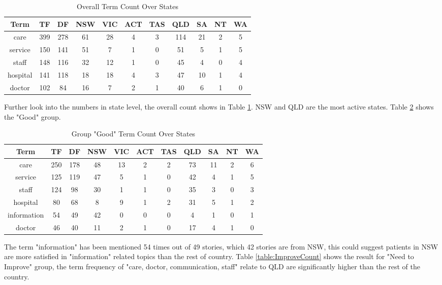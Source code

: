 \documentclass[11pt,twoside]{report}
\begin{document}
\begin{table}[h]
\caption{Overall Term Count Over States}
\centering
\begin{tabular}{| c | c | c | c | c | c | c | c |c | c | c |}
\hline\hline
Term & TF & DF & NSW & VIC & ACT & TAS & QLD & SA & NT & WA \\
\hline
care & 399 & 278 & 61 & 28 & 4 & 3 & 114 & 21 & 2 & 5 \\
\hline
service & 150 & 141 & 51 & 7 & 1 & 0 & 51 & 5 & 1 & 5 \\
\hline
staff & 148 & 116 & 32 & 12 & 1 & 0 & 45 & 4 & 0 & 4 \\
\hline
hospital & 141 & 118 & 18 & 18 & 4 & 3 & 47 & 10 & 1 & 4 \\
\hline
doctor & 102 & 84 & 16 & 7 & 2 & 1 & 40 & 6 & 1 & 0 \\
\hline
\end{tabular}
\label{table:OverAllCount}
\end{table}

Further look into the numbers in state level, the overall count shows in Table \ref{table:OverAllCount}. NSW and QLD are the most active states. Table \ref{table:GoodCount} shows the "Good" group. 

\begin{table}[h]
\caption{Group "Good" Term Count Over States}
\centering
\begin{tabular}{| c | c | c | c | c | c | c | c |c | c | c |}
\hline\hline
Term & TF & DF & NSW & VIC & ACT & TAS & QLD & SA & NT & WA \\
\hline
care & 250 & 178 & 48 & 13 & 2 & 2 & 73 & 11 & 2 & 6 \\
\hline
service & 125 & 119 & 47 & 5 & 1 & 0 & 42 & 4 & 1 & 5 \\
\hline
staff & 124 & 98 & 30 & 1 & 1 & 0 & 35 & 3 & 0 & 3 \\
\hline
hospital & 80 & 68 & 8 & 9 & 1 & 2 & 31 & 5 & 1 & 2 \\
\hline
information & 54 & 49 & 42 & 0 & 0 & 0 & 4 & 1 & 0 & 1 \\
\hline
doctor & 46 & 40 & 11 & 2 & 1 & 0 & 17 & 4 & 1 & 0 \\
\hline
\end{tabular}
\label{table:GoodCount}
\end{table}

The term "information" has been mentioned 54 times out of 49 stories, which 42 stories are from NSW, this could suggest patients in NSW are more satisfied in "information" related topics than the rest of country. Table \ref{table:ImproveCount} shows the result for "Need to Improve" group, the term frequency of  "care, doctor, communication, staff" relate to QLD are significantly higher than the rest of the country. 
\end{document}

